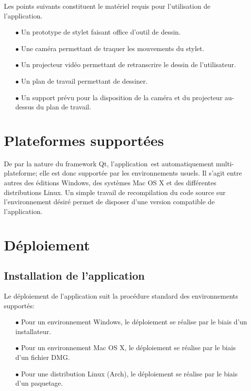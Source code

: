\documentclass[11pt,a4paper,oldfontcommands]{memoir}
\begin{document}
Les points suivants constituent le matériel requis pour l'utilisation de l'application.

\begin{itemize}
\item[$\bullet$] Un prototype de stylet faisant office d'outil de dessin.
\item[$\bullet$] Une caméra permettant de traquer les mouvements du stylet. 
\item[$\bullet$] Un projecteur vidéo permettant de retranscrire le dessin de l'utilisateur.
\item[$\bullet$] Un plan de travail permettant de dessiner.
\item[$\bullet$] Un support prévu pour la disposition de la caméra et du projecteur au-dessus du plan de travail.
\end{itemize}

\section{Plateformes supportées}

De par la nature du framework Qt, l'application est automatiquement multi-plateforme; elle est donc supportée par les environnements usuels. Il s'agit entre autres des éditions Windows, des systèmes Mac OS X et des différentes distributions Linux. Un simple travail de recompilation du code source sur l'environnement désiré permet de disposer d'une version compatible de l'application.

\section{Déploiement}

\subsection{Installation de l'application}

Le déploiement de l'application suit la procédure standard des environnements supportés:

\begin{itemize}
\item[$\bullet$] Pour un environnement Windows, le déploiement se réalise par le biais d'un installateur. 
\item[$\bullet$] Pour un environnement Mac OS X, le déploiement se réalise par le biais d'un fichier DMG.
\item[$\bullet$] Pour une distribution Linux (Arch), le déploiement se réalise par le biais d'un paquetage.
\end{itemize}
\end{document}
